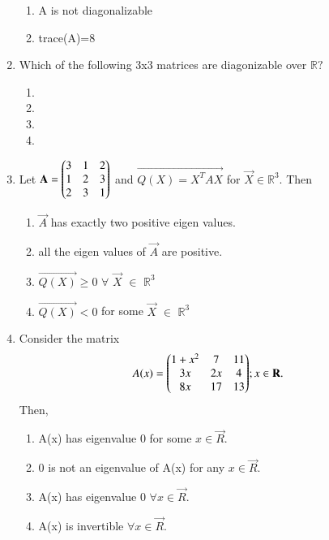 \begin{enumerate}[label=\thesection.\arabic*.,ref=\thesection.\theenumi]
\begin{enumerate}
\item A is not diagonalizable
\item trace(A)=8
\end{enumerate}
%
\solution

\item Which of the following 3x3 matrices are diagonizable over $\mathbb{R}?$\\
\begin{enumerate}
    \item {}
    \item {}
    \item {}
    \item {}
\end{enumerate}
%
\solution

\twocolumn
\item Let $\mathbf{A} = \begin{pmatrix}3 & 1 & 2 \\ 1 & 2 & 3 \\ 2 & 3 & 1  \end{pmatrix}$ and $\vec{Q(X) = X^TAX}$ for $\vec{X} \in \mathbb{R}^{3}$. Then
\begin{enumerate}
	\item $\vec{A}$ has exactly two positive eigen values.
	\item all the eigen values of $\vec{A}$ are positive.
	\item $\vec{Q(X)} \geq 0 $ $\forall$ $\vec{X}$ $\in$ $\mathbb{R}^3$
	\item $\vec{Q(X)} < 0 $ for some $\vec{X}$ $\in$ $\mathbb{R}^3$
\end{enumerate}
%
%
\solution

\item Consider the matrix
\begin{align}
A(x) = \begin{pmatrix}1+x^2&7&11\\3x&2x&4\\8x&17&13\end{pmatrix} & ;x\in \mathbf{R}.
\end{align}
Then,
\begin{enumerate}
\item A(x) has eigenvalue 0 for some $x\in \vec{R}$.
\item 0 is not an eigenvalue of A(x) for any $x\in \vec{R}$.
\item A(x) has eigenvalue 0 $\forall x\in \vec{R}$.
\item A(x) is invertible $\forall x\in \vec{R}$.
\end{enumerate}
%
\solution

\end{enumerate}

